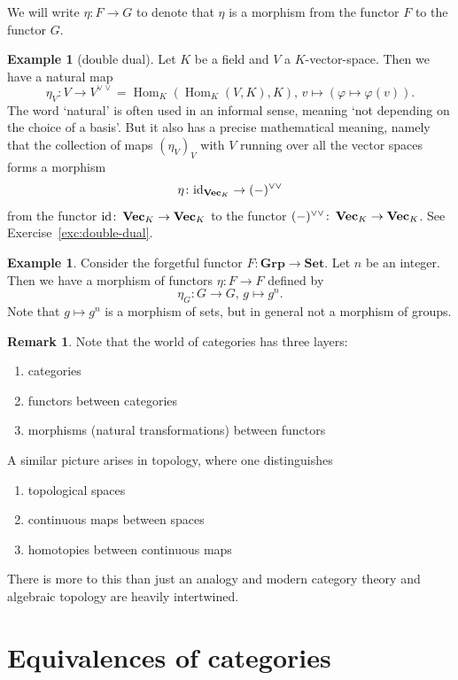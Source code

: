\documentclass[11pt]{amsbook}
\DeclareMathOperator\Hom{Hom}
\renewcommand{\Vec}{\operatorname{{\bf{Vec}}}}
\def\id{{\rm id}}
\def\Set{\mathbf{Set}}
\def\Grp{\mathbf{Grp}}
\theoremstyle{plain}
\theoremstyle{definition}
\newtheorem{example}[theorem]{Example}
\newtheorem{remark}[theorem]{Remark}
\begin{document}
We will  write $\eta\colon F\to G$ to denote that $\eta$ is a morphism from the functor $F$ to the functor $G$.

\begin{example}[double dual]\label{exa:double-dual}
Let $K$ be a field and $V$ a $K$-vector-space. Then we have a natural map
\[
	\eta_V\colon V \to V^{\vee\vee} = \Hom_K(\Hom_K(V,K),K),\,
	v \mapsto \left( \varphi \mapsto \varphi(v) \right).
\]
The word `natural' is often used in an informal sense, meaning `not depending on the choice of a basis'. But it also has a precise mathematical meaning, namely that the collection of maps $(\eta_V)_V$ with $V$ running over all the vector spaces forms a morphism
\[
	\eta\colon \id_{\Vec_K} \to (-)^{\vee\vee}
\]
from the functor $\id\colon \Vec_K \to \Vec_K$ to the functor $(-)^{\vee\vee}\colon \Vec_K \to \Vec_K$.
See Exercise~\ref{exc:double-dual}.
\end{example}

\begin{example}
Consider the forgetful functor $F\colon \Grp \to \Set$. Let $n$ be an integer. Then we have a morphism of functors $\eta\colon F \to F$ defined by
\[
	\eta_G \colon G \to G,\,g \mapsto g^n.
\]
Note that $g\mapsto g^n$ is a morphism of sets, but in general not a morphism of groups.
\end{example}

\begin{remark}\label{rmk:2-cat}
Note that the world of categories has three layers:
\begin{enumerate}
\item[(0)] categories
\item[(1)] functors between categories
\item[(2)] morphisms (natural transformations) between functors
\end{enumerate}
A similar picture arises in topology, where one distinguishes
\begin{enumerate}
\item[(0)] topological spaces
\item[(1)] continuous maps between spaces
\item[(2)] homotopies between continuous maps
\end{enumerate}
There is more to this than just an analogy and modern category theory and algebraic topology are heavily intertwined.

\end{remark}


\section{Equivalences of categories}
\end{document}
